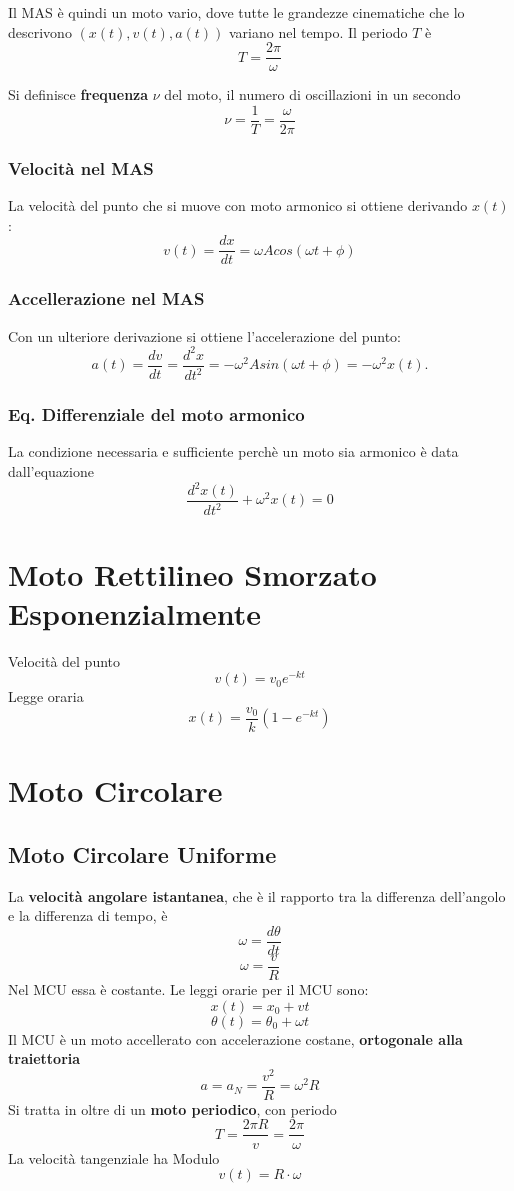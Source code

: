 \documentclass[a4paper]{report}
\begin{document}
    Il MAS è quindi un moto vario, dove tutte le grandezze cinematiche che lo descrivono $(x(t), v(t), a(t))$ variano nel tempo.
    Il periodo $T$ è
    \[ T = \frac{2\pi}{\omega} \]

    Si definisce \textbf{frequenza} $\nu$ del moto, il numero di oscillazioni in un secondo
    \[ \nu = \frac{1}{T}=\frac{\omega}{2\pi} \]
  \subsubsection{Velocità nel MAS}
  La velocità del punto che si muove con moto armonico si ottiene derivando $x(t)$:
  \[ v(t)=\frac{dx}{dt} = \omega A cos(\omega t + \phi) \]
  \subsubsection{Accellerazione nel MAS}
  Con un ulteriore derivazione si ottiene l'accelerazione del punto:
  \[ a(t)=\frac{dv}{dt}=\frac{d^2 x}{dt^2} = -\omega^2 A sin(\omega t + \phi) = -\omega^2 x(t). \]
  \subsubsection{Eq. Differenziale del moto armonico}
  La condizione necessaria e sufficiente perchè un moto sia armonico è data dall'equazione
  \[ \frac{d^2 x(t)}{dt^2} + \omega^2 x(t) = 0 \]

  \section{Moto Rettilineo Smorzato Esponenzialmente}
  Velocità del punto
  \[ v(t) = v_0 e^{-kt} \]
  Legge oraria
  \[ x(t) = \frac{v_0}{k} (1-e^{-kt}) \]

  \section{Moto Circolare}

  \subsection{Moto Circolare Uniforme}
  La \textbf{velocità angolare istantanea}, che è il rapporto tra la differenza dell'angolo e la differenza di tempo, è
  \[ \omega = \frac{d\theta}{dt} \]
  \[ \omega = \frac{v}{R} \]
  Nel MCU essa è costante. Le leggi orarie per il MCU sono:
  \[ x(t) =x_0 + vt\]
  \[ \theta(t) = \theta_0 + \omega t\]
  Il MCU è un moto accellerato con accelerazione costane, \textbf{ortogonale alla traiettoria}
  \[ a= a_N = \frac{v^2}{R} = \omega^2 R \]
  Si tratta in oltre di un \textbf{moto periodico}, con periodo
  \[ T=\frac{2\pi R}{v} = \frac{2\pi}{\omega} \]
  La velocità tangenziale ha Modulo
  \[ v(t) = R \cdot \omega \]
\end{document}
